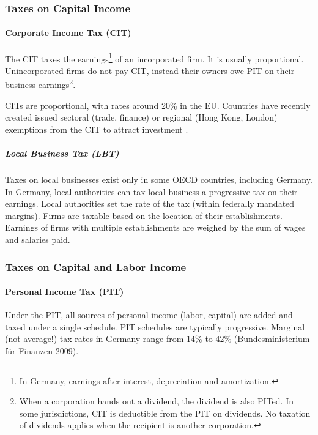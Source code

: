 \subsubsection{Taxes on Capital Income}

\paragraph{Corporate Income Tax (CIT)}  \label{sec:CIT} The  \gls{CIT} taxes the earnings\footnote{In Germany, earnings after interest, depreciation and amortization.} of an incorporated firm. It is usually proportional. Unincorporated firms do not pay \gls{CIT}, instead their owners owe \gls{PIT} on their business earnings\footnote{
	When a corporation hands out a dividend, the dividend is also \gls{PIT}ed. In some jurisdictions, \gls{CIT} is deductible from the \gls{PIT} on dividends. No taxation of dividends applies when the recipient is another corporation.}.

\glspl{CIT} are proportional, with rates around 20\% in the EU. Countries have recently created issued sectoral (trade, finance) or regional (Hong Kong, London) exemptions from the \gls{CIT} to attract investment \citep{Genschel2009,Ganghof2007,Genschel2005}.

\subparagraph{Local Business Tax (LBT)}  \label{sec:LBT} Taxes on local businesses exist only in some OECD countries, including Germany. In Germany, local authorities can tax local business a progressive tax on their earnings. Local authorities set the rate of the tax (within federally mandated margins). Firms are taxable based on the location of their establishments. Earnings of firms with multiple establishments are weighed by the sum of wages and salaries paid.

\subsubsection{Taxes on Capital and Labor Income}

\paragraph{Personal Income Tax (PIT)}  \label{sec:PIT} Under the  \gls{PIT}, all sources of personal income (labor, capital) are added and taxed under a single schedule. \gls{PIT} schedules are typically progressive. Marginal (not average!) tax rates in Germany range from 14\% to 42\% (Bundesministerium f\"ur Finanzen 2009).

